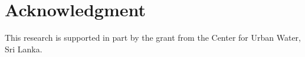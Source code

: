 \documentclass[conference]{IEEEtran}
\newcommand{\db}[1]{\textcolor{blue!40}{#1}}
\begin{document}
\section*{Acknowledgment}
\label{pse:ack}
\db{This research is supported in part by the grant from the Center for Urban Water, Sri Lanka.}


\graphicspath{ {./images/} }

\printbibliography[title={References}]
\end{document}
